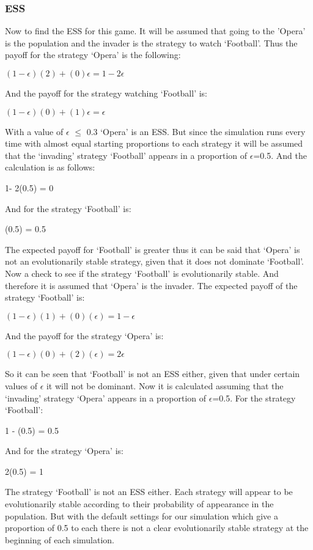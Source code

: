 \subsubsection{ESS}
Now to find the ESS for this game. It will be assumed that going to the 'Opera' is the population and the invader is the strategy to watch `Football'. Thus the payoff for the strategy `Opera' is the following:
\begin{center}
$(1-{\epsilon})(2) + (0){\epsilon} = 1 - 2{\epsilon}$
\end{center}
And the payoff for the strategy watching `Football' is:
\begin{center}
$(1-{\epsilon})(0) + (1){\epsilon} = {\epsilon}$
\end{center}
With a value of $\epsilon$ $\leq$ 0.3 `Opera' is an ESS. But since the simulation runs every time with almost equal starting proportions to each strategy it will be assumed that the `invading' strategy `Football' appears in a proportion of $\epsilon$=0.5. And the calculation is as follows:
\begin{center}
1- 2(0.5) = 0
\end{center}
And for the strategy `Football' is:
\begin{center}
 (0.5) = 0.5
\end{center}
The expected payoff for `Football' is greater thus it can be said that `Opera' is not an evolutionarily stable strategy, given that it does not dominate  `Football'.
Now a check to see if the strategy `Football' is evolutionarily stable. And therefore it is assumed that `Opera' is the invader. The expected payoff of the strategy `Football' is:
\begin{center}
$(1-{\epsilon})(1) + (0)({\epsilon}) = 1 - {\epsilon} $
\end{center}
And the payoff for the strategy `Opera' is:
\begin{center}
$(1-{\epsilon})(0) + (2)({\epsilon}) =  2{\epsilon}$
\end{center}
So it can be seen that `Football' is not an ESS either, given that under certain values of $\epsilon$ it will not be dominant. Now it is calculated assuming that the `invading' strategy `Opera' appears in a proportion of $\epsilon$=0.5. For the strategy `Football':
\begin{center}
1 -  (0.5) = 0.5
\end{center}
And for the strategy `Opera' is:
\begin{center}
 2(0.5)  = 1
\end{center}
The strategy `Football' is not an ESS either. Each strategy will appear to be evolutionarily stable according to their probability of appearance in the population. But with the default settings for our simulation which give a proportion of 0.5 to each there is not a clear evolutionarily stable strategy at the beginning of each simulation.


